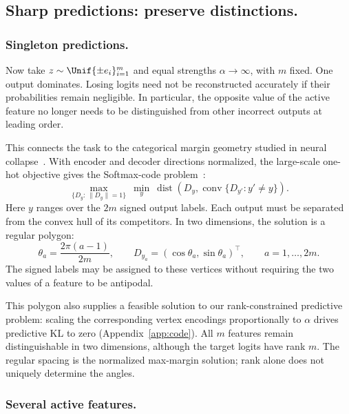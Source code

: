 \subsection{Sharp predictions: preserve distinctions.}

\subsubsection{Singleton predictions.}

Now take $z\sim\Unif\{\pm e_i\}_{i=1}^m$ and equal strengths
$\alpha\to\infty$, with $m$ fixed. One output dominates. Losing
logits need not be reconstructed accurately if their probabilities
remain negligible. In particular, the opposite value of the active
feature no longer needs to be distinguished from other incorrect
outputs at leading order.

This connects the task to the categorical margin geometry studied
in neural collapse~\cite{lu,jiang}. With encoder and decoder
directions normalized, the large-scale one-hot objective gives
the Softmax-code problem~\cite{jiang}:
\begin{equation}
\boxed{
\max_{\{D_y:\,\|D_y\|=1\}}
\ \min_y\
\operatorname{dist}\!\left(
D_y,\operatorname{conv}\{D_{y'}:y'\ne y\}
\right).
}
\label{eq:packing}
\end{equation}
Here $y$ ranges over the $2m$ signed output labels. Each output
must be separated from the convex hull of its competitors.
In two dimensions, the solution is a regular polygon:
\begin{equation}
\theta_a=\frac{2\pi(a-1)}{2m},
\qquad
D_{y_a}=(\cos\theta_a,\sin\theta_a)^\top,
\qquad a=1,\ldots,2m.
\label{eq:circle}
\end{equation}
The signed labels may be assigned to these vertices without
requiring the two values of a feature to be antipodal.

This polygon also supplies a feasible solution to our
rank-constrained predictive problem: scaling the corresponding
vertex encodings proportionally to $\alpha$ drives predictive KL
to zero (Appendix~\ref{app:code}). All $m$ features remain
distinguishable in two dimensions, although the target logits
have rank $m$. The regular spacing is the normalized max-margin
solution; rank alone does not uniquely determine the angles.

\subsubsection{Several active features.}

